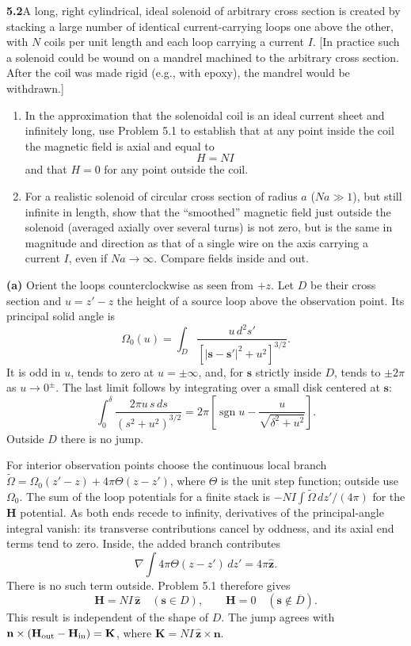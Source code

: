 \par\bigskip
\noindent\textbf{5.2}\quad A long, right cylindrical, ideal solenoid of arbitrary cross section is created by stacking a large number of identical current-carrying loops one above the other, with $N$ coils per unit length and each loop carrying a current $I$. [In practice such a solenoid could be wound on a mandrel machined to the arbitrary cross section. After the coil was made rigid (e.g., with epoxy), the mandrel would be withdrawn.]
\begin{enumerate}
\item[(a)] In the approximation that the solenoidal coil is an ideal current sheet and infinitely long, use Problem 5.1 to establish that at any point inside the coil the magnetic field is axial and equal to
\[
H=NI
\]
and that $H=0$ for any point outside the coil.
\item[(b)] For a realistic solenoid of circular cross section of radius $a$ ($Na\gg1$), but still infinite in length, show that the ``smoothed'' magnetic field just outside the solenoid (averaged axially over several turns) is not zero, but is the same in magnitude and direction as that of a single wire on the axis carrying a current $I$, even if $Na\to\infty$. Compare fields inside and out.
\end{enumerate}
\solution
\textbf{(a)} Orient the loops counterclockwise as seen from $+z$.
Let $D$ be their cross section and $u=z'-z$ the height of a source loop
above the observation point. Its principal solid angle is
\[
\Omega_0(u)=\int_D\frac{u\,d^2s'}{[|\mathbf s-\mathbf s'|^2+u^2]^{3/2}}.
\]
It is odd in $u$, tends to zero at $u=\pm\infty$, and, for
$\mathbf s$ strictly inside $D$, tends to $\pm2\pi$ as $u\to0^\pm$.
The last limit follows by integrating over a small disk centered at
$\mathbf s$:
\[
\int_0^\delta\frac{2\pi u\,s\,ds}{(s^2+u^2)^{3/2}}
=2\pi\left[\operatorname{sgn}u-\frac{u}{\sqrt{\delta^2+u^2}}\right].
\]
Outside $D$ there is no jump.

For interior observation points choose the continuous local branch
$\widetilde\Omega=\Omega_0(z'-z)+4\pi\Theta(z-z')$, where $\Theta$ is the
unit step function; outside use $\Omega_0$.
The sum of the loop potentials for a finite stack is
$-NI\int\widetilde\Omega\,dz'/(4\pi)$ for the $\mathbf H$ potential.
As both ends recede to infinity, derivatives of the principal-angle
integral vanish: its transverse contributions cancel by oddness, and its
axial end terms tend to zero. Inside, the added branch contributes
\[
\nabla\int4\pi\Theta(z-z')\,dz'=4\pi\widehat{\mathbf z}.
\]
There is no such term outside. Problem 5.1 therefore gives
\[
\boxed{\mathbf H=NI\,\widehat{\mathbf z}\quad(\mathbf s\in D),
\qquad\mathbf H=0\quad(\mathbf s\notin\overline D).}
\]
This result is independent of the shape of $D$. The jump agrees with
$\mathbf n\times(\mathbf H_{\rm out}-\mathbf H_{\rm in})=\mathbf K$,
where $\mathbf K=NI\,\widehat{\mathbf z}\times\mathbf n$.

